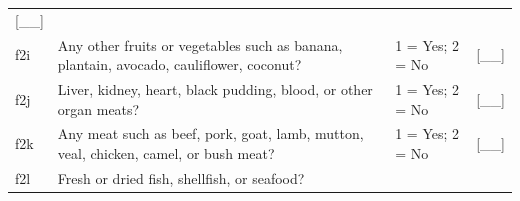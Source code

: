 \documentclass[12pt,a4paper]{book}
\theoremstyle{definition}
\theoremstyle{definition}
\theoremstyle{definition}
\theoremstyle{remark}
\begin{document}
\begin{longtable}[]{@{}llll@{}}
\begin{minipage}[t]{0.13\columnwidth}
{[}\_\_{]}\strut
\end{minipage}\tabularnewline
\begin{minipage}[t]{0.09\columnwidth}\raggedright
f2i\strut
\end{minipage} & \begin{minipage}[t]{0.41\columnwidth}\raggedright
Any other fruits or vegetables such as banana, plantain, avocado,
cauliflower, coconut?\strut
\end{minipage} & \begin{minipage}[t]{0.25\columnwidth}\raggedright
1 = Yes; 2 = No\strut
\end{minipage} & \begin{minipage}[t]{0.13\columnwidth}\raggedright
{[}\_\_{]}\strut
\end{minipage}\tabularnewline
\begin{minipage}[t]{0.09\columnwidth}\raggedright
f2j\strut
\end{minipage} & \begin{minipage}[t]{0.41\columnwidth}\raggedright
Liver, kidney, heart, black pudding, blood, or other organ meats?\strut
\end{minipage} & \begin{minipage}[t]{0.25\columnwidth}\raggedright
1 = Yes; 2 = No\strut
\end{minipage} & \begin{minipage}[t]{0.13\columnwidth}\raggedright
{[}\_\_{]}\strut
\end{minipage}\tabularnewline
\begin{minipage}[t]{0.09\columnwidth}\raggedright
f2k\strut
\end{minipage} & \begin{minipage}[t]{0.41\columnwidth}\raggedright
Any meat such as beef, pork, goat, lamb, mutton, veal, chicken, camel,
or bush meat?\strut
\end{minipage} & \begin{minipage}[t]{0.25\columnwidth}\raggedright
1 = Yes; 2 = No\strut
\end{minipage} & \begin{minipage}[t]{0.13\columnwidth}\raggedright
{[}\_\_{]}\strut
\end{minipage}\tabularnewline
\begin{minipage}[t]{0.09\columnwidth}\raggedright
f2l\strut
\end{minipage} & \begin{minipage}[t]{0.41\columnwidth}\raggedright
Fresh or dried fish, shellfish, or seafood?\strut
\end{minipage} & \begin{minipage}[t]{0.25\columnwidth}\raggedright

\end{minipage}
\end{longtable}
\end{document}
